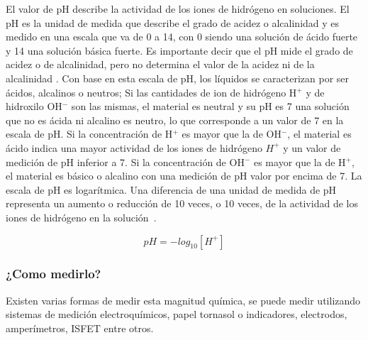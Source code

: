 El valor de pH describe la actividad de los iones de hidrógeno en soluciones. 
El pH es la unidad de medida que describe el grado de acidez o alcalinidad y es medido en una escala que va de 0 a 14, con 0 siendo una solución de ácido fuerte y 14 una solución básica fuerte. 
Es importante decir que el pH mide el grado de acidez o de alcalinidad, pero no determina el valor de la acidez ni de la alcalinidad \cite{sierra_ramirez_calidad_2011}. 
Con base en esta escala de pH, los líquidos se caracterizan por ser ácidos, alcalinos o neutros; Si las cantidades de ion de hidr\'ogeno H$^{+}$ y de hidroxilo OH$^{-}$ son las mismas, el material es neutral y su pH es 7 una solución que no es ácida ni alcalino es neutro, lo que corresponde a un valor de 7 en la escala de pH. 
Si la concentración de H$^{+}$ es mayor que la de OH$^{-}$, el material es ácido indica una mayor actividad de los iones de hidrógeno $H^{+}$ y un valor de medición de pH inferior a 7. 
Si la concentración de OH$^{-}$ es mayor que la de H$^{+}$, el material es básico o alcalino con una medición de pH valor por encima de 7.
La escala de pH es logarítmica. Una diferencia de una unidad de medida de pH representa un aumento o reducción de 10 veces, o 10 veces, de la actividad de los iones de hidrógeno en la solución~\cite{covington_definition_1985}.


\begin{equation} \label{ecuacionpH} 
pH=-log_{10}[H^{+}]
\end{equation}

\subsubsection{¿Como medirlo?}
Existen varias formas de medir esta magnitud qu\'imica, se puede medir utilizando sistemas de medici\'on electroqu\'imicos, papel tornasol o indicadores, electrodos, amper\'imetros, ISFET entre otros. 

